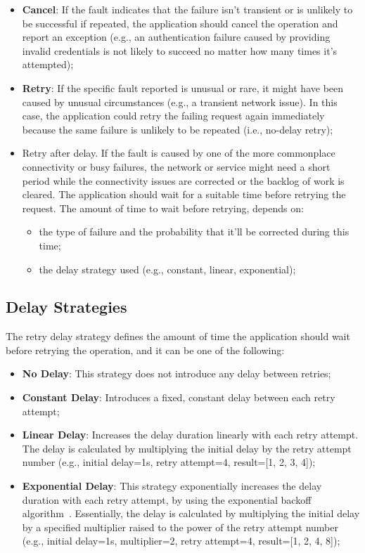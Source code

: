 \begin{itemize}
    \item \textbf{Cancel}: If the fault indicates that the failure isn't transient or is unlikely to be successful if repeated, the application should cancel the operation and report an exception (e.g., an authentication failure caused by providing invalid credentials is not likely to succeed no matter how many times it's attempted);
    \item \textbf{Retry}: If the specific fault reported is unusual or rare, it might have been caused by unusual circumstances (e.g., a transient network issue).
    In this case, the application could retry the failing request again immediately because the same failure is unlikely to be repeated (i.e., no-delay retry);
    \item Retry after delay.
    If the fault is caused by one of the more commonplace connectivity or busy failures, the network or service might need a short period while the connectivity issues are corrected or the backlog of work is cleared.
    The application should wait for a suitable time before retrying the request.
    The amount of time to wait before retrying, depends on:
    \begin{itemize}
        \item the type of failure and the probability that it'll be corrected during this time;
        \item the delay strategy used (e.g., constant, linear, exponential);
    \end{itemize}
\end{itemize}

\subsection{Delay Strategies}\label{subsec:retry-delay-strategies}

The retry delay strategy defines the amount of time the application should wait before retrying the operation, and it can be one of the following:

\begin{itemize}
    \item \textbf{No Delay}: This strategy does not introduce any delay between retries;
    \item \textbf{Constant Delay}: Introduces a fixed, constant delay between each retry attempt;
    \item \textbf{Linear Delay}: Increases the delay duration linearly with each retry attempt.
    The delay is calculated by multiplying the initial delay by the retry attempt number (e.g., initial delay=1s, retry attempt=4, result=[1, 2, 3, 4]);
    \item \textbf{Exponential Delay}: This strategy exponentially increases the delay duration with each retry attempt, by using the exponential backoff algorithm~\cite{wiki:exponential-backoff}.
    Essentially, the delay is calculated by multiplying the initial delay by a specified multiplier raised to the power of the retry attempt number (e.g., initial delay=1s, multiplier=2, retry attempt=4, result=[1, 2, 4, 8]);
\end{itemize}


